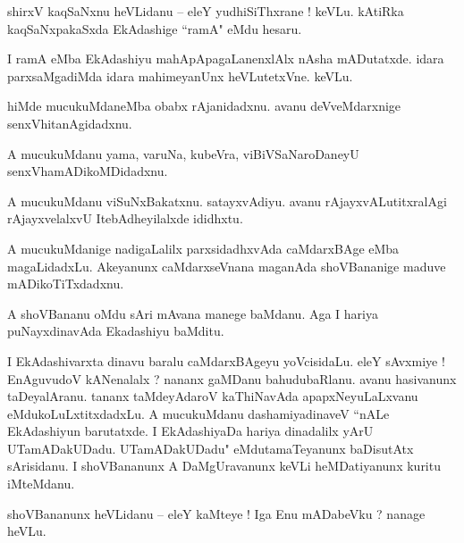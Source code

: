\documentclass{article}
\begin{document}
\begin{mn}%
shirxV kaqSaNxnu heVLidanu -- eleY yudhiSiThxrane ! keVLu. kAtiRka kaqSaNxpakaSxda EkAdashige 
``ramA" eMdu hesaru.
\end{mn}

\begin{mn}%
I ramA eMba EkAdashiyu mahApApagaLanenxlAlx nAsha mADutatxde. idara parxsaMgadiMda idara 
mahimeyanUnx heVLutetxVne. keVLu.
\end{mn}

\begin{mn}%
hiMde mucukuMdaneMba obabx rAjanidadxnu. avanu deVveMdarxnige senxVhitanAgidadxnu.
\end{mn}

\begin{mn}%
A mucukuMdanu yama, varuNa, kubeVra, viBiVSaNaroDaneyU senxVhamADikoMDidadxnu.
\end{mn}

\begin{mn}%
A mucukuMdanu viSuNxBakatxnu. satayxvAdiyu. avanu rAjayxvALutitxralAgi rAjayxvelalxvU 
ItebAdheyilalxde ididhxtu.
\end{mn}

\begin{mn}%
A mucukuMdanige nadigaLalilx parxsidadhxvAda caMdarxBAge eMba magaLidadxLu. Akeyanunx 
caMdarxseVnana maganAda shoVBananige maduve mADikoTiTxdadxnu.
\end{mn}

\begin{mn}%
A shoVBananu oMdu sAri mAvana manege baMdanu. Aga I hariya puNayxdinavAda Ekadashiyu baMditu.
\end{mn}

\begin{mn}%
I EkAdashivarxta dinavu baralu caMdarxBAgeyu yoVcisidaLu. eleY sAvxmiye ! EnAguvudoV kANenalalx ? 
nananx gaMDanu bahudubaRlanu. avanu hasivanunx taDeyalAranu. tananx taMdeyAdaroV kaThiNavAda 
apapxNeyuLaLxvanu eMdukoLuLxtitxdadxLu. A mucukuMdanu dashamiyadinaveV ``nALe EkAdashiyun 
barutatxde. I EkAdashiyaDa hariya dinadalilx yArU UTamADakUDadu. UTamADakUDadu" eMdutamaTeyanunx 
baDisutAtx sArisidanu. I shoVBananunx A DaMgUravanunx keVLi heMDatiyanunx kuritu iMteMdanu.
\end{mn}

\begin{mn}%
shoVBananunx heVLidanu -- eleY kaMteye ! Iga Enu mADabeVku ? nanage heVLu.
\end{mn}
\end{document}
